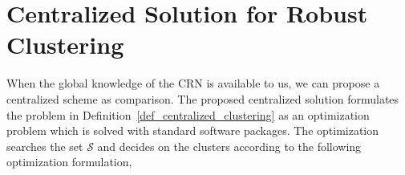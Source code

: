 \documentclass[times]{ettauth}
\theoremstyle{mytheoremstyle}
\theoremstyle{mytheoremstyle}
\theoremstyle{mytheoremstyle}
\begin{document}





\section{Centralized Solution for Robust Clustering}
\label{centralized_solution}
When the global knowledge of the CRN is available to us, we can propose a centralized scheme as comparison.
The proposed centralized solution formulates the problem in Definition~\ref{def_centralized_clustering} as an optimization problem which is solved with standard software packages.
The optimization searches the set $\mathcal{S}$ and decides on the clusters according to the following optimization formulation,
%
%


 


\end{document}
